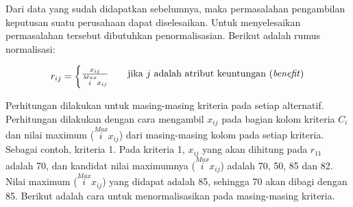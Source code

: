 	Dari data yang sudah didapatkan sebelumnya, maka permasalahan pengambilan keputusan suatu perusahaan dapat diselesaikan. Untuk menyelesaikan permasalahan tersebut dibutuhkan penormalisasian. Berikut adalah rumus normalisasi:
	
	\[ r_{ij}  =
  \begin{cases}
    \frac{x_{ij}}{\stackrel{Max}{i} x_{ij}}      & \quad \text{jika } j \text{ adalah atribut keuntungan (\textit{benefit})}\\
	\end{cases}	  
\]
	
	Perhitungan dilakukan untuk masing-masing kriteria pada setiap alternatif. Perhitungan dilakukan dengan cara mengambil $x_{ij}$ pada bagian kolom kriteria $C_{i}$ dan nilai maximum (${\stackrel{Max}{i} x_{ij}}$) dari masing-masing kolom pada setiap kriteria. Sebagai contoh, kriteria 1. Pada kriteria 1, $x_{ij}$ yang akan dihitung pada $r_{11}$ adalah 70, dan kandidat nilai maximumnya (${\stackrel{Max}{i} x_{ij}}$) adalah 70, 50, 85 dan 82. Nilai maximum (${\stackrel{Max}{i} x_{ij}}$) yang didapat adalah 85, sehingga 70 akan dibagi dengan 85. Berikut adalah cara untuk menormalisasikan pada masing-masing kriteria.

